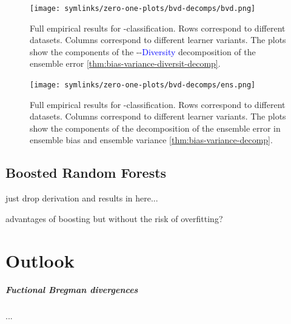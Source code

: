 \documentclass[
    a4paper, %
	fontsize=10pt, %
	twoside=false, %
]{kaobook}
\begin{document}


\begin{figure}[hb]
	\texttt{[image: symlinks/zero-one-plots/bvd-decomps/bvd.png]}
	\caption{
        Full empirical results for \zeroone-classification. Rows correspond to different datasets. Columns correspond to different learner variants. The plots show the components of the 
        \textcolor{orange}{}-\textcolor{green}{}-\textcolor{blue}{Diversity} decomposition of the ensemble error \ref{thm:bias-variance-diversit-decomp}.
    }
    \label{fig:zero-one-bvd-plots}
\end{figure}

\begin{figure}[hb]
	\texttt{[image: symlinks/zero-one-plots/bvd-decomps/ens.png]}
	\caption{
        Full empirical results for \zeroone-classification. Rows correspond to different datasets. Columns correspond to different learner variants. The plots show the components of the 
        decomposition of the ensemble error in ensemble bias and ensemble variance \ref{thm:bias-variance-decomp}.
    }
    \label{fig:zero-one-bvd-plots}
\end{figure}


\section{Boosted Random Forests}

just drop derivation and results in here...

advantages of boosting but without the risk of overfitting?

\chapter{Outlook}

\paragraph{Fuctional Bregman divergences} ...
\end{document}
